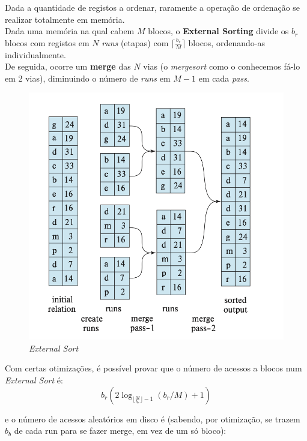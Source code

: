 \documentclass[oneside]{book}
\theoremstyle{definition}
\begin{document}
Dada a quantidade de registos a ordenar, raramente a operação de ordenação se realizar totalmente em memória.\\
Dada uma memória na qual cabem $M$ blocos, o \textbf{External Sorting} divide os $b_r$ blocos com registos em $N$ \textit{runs} (etapas) com $\lceil\frac{b_r}{M}\rceil$ blocos, ordenando-as individualmente.\\
De seguida, ocorre um \textbf{merge} das $N$ vias (o \textit{mergesort} como o conhecemos fá-lo em 2 vias), diminuindo o número de \textit{runs} em $M - 1$ em cada \textit{pass}.
\vspace{-1em}
\begin{figure}[H]
    \centering
    \includegraphics[scale = 0.35]{cap_indices/external_sort.png}
    \caption{\textit{External Sort}}
\end{figure}

Com certas otimizações, é possível provar que o número de acessos a blocos num \textit{External Sort} é:
\[
    b_r(2 \log_{\lfloor\frac{M}{b_r}\rfloor - 1}(b_r / M) + 1)
\]

e o número de acessos aleatórios em disco é (sabendo, por otimização, se trazem $b_b$ de cada run para se fazer merge, em vez de um só bloco):
\end{document}
